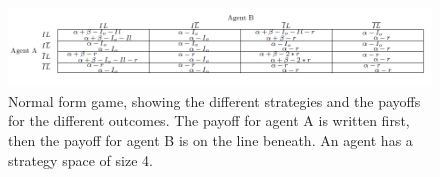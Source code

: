 \begin{figure} %
\centering
\includegraphics[width=1.0\textwidth]{../Figures/FirstGameWithParameters.png}
\caption{\label{fig:FirstGameTheoryModel} Normal form game, showing the different strategies and the payoffs  for the different outcomes. The payoff for agent A is written first, then the payoff for agent B is on the line beneath.
 An agent has a strategy space of size 4. }

\end{figure}


